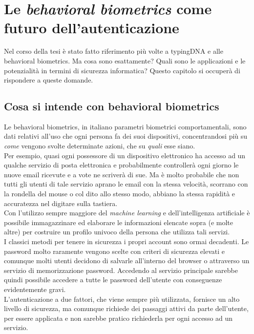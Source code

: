 \chapter{Le \emph{behavioral biometrics} come futuro dell'autenticazione}
Nel corso della tesi è stato fatto riferimento più volte a typingDNA e alle behavioral biometrics. Ma cosa sono esattamente? Quali sono le applicazioni e le potenzialità in termini di sicurezza informatica? Questo capitolo si occuperà di rispondere a queste domande.\\

\section{Cosa si intende con behavioral biometrics}
Le behavioral biometrics, in italiano parametri biometrici comportamentali, sono dati relativi all'uso che ogni persona fa dei suoi dispositivi, concentrandosi più su \emph{come} vengono svolte determinate azioni, che su \emph{quali} esse siano.\\
Per esempio, quasi ogni possessore di un dispositivo elettronico ha accesso ad un qualche servizio di posta elettronica e probabilmente controllerà ogni giorno le nuove email ricevute e a vote ne scriverà di sue. Ma è molto probabile che non tutti gli utenti di tale servizio aprano le email con la stessa velocità, scorrano con la rondella del mouse o col dito allo stesso modo, abbiano la stessa rapidità e accuratezza nel digitare sulla tastiera.\\
Con l'utilizzo sempre maggiore del \emph{machine learning} e dell'intelligenza artificiale è possibile immagazzinare ed elaborare le informazioni elencate sopra (e molte altre) per costruire un profilo univoco della persona che utilizza tali servizi.\\
I classici metodi per tenere in sicurezza i propri account sono ormai decadenti. Le password molto raramente vengono scelte con criteri di sicurezza elevati e comunque molti utenti decidono di salvarle all'interno del browser o attraverso un servizio di memorizzazione password. Accedendo al servizio principale sarebbe quindi possibile accedere a tutte le password dell'utente con conseguenze evidentemente gravi.\\
L'autenticazione a due fattori, che viene sempre più utilizzata, fornisce un alto livello di sicurezza, ma comunque richiede dei passaggi attivi da parte dell'utente, per essere applicata e non sarebbe pratico richiederla per ogni accesso ad un servizio.\\
